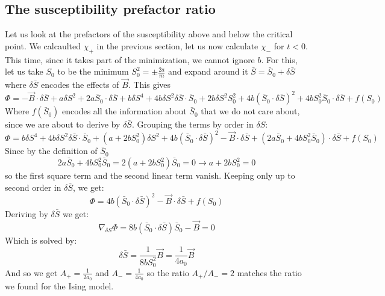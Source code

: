 \documentclass{article}
\begin{document}
\subsection{The susceptibility prefactor ratio}
Let us look at the prefactors of the susceptibility above and below the critical point. We calcaulted $\chi_{+}$ in the previous section, let us now calculate $\chi_{-}$ for $t < 0$. This time, since it takes part of the minimization, we cannot ignore $b$. For this, let us take $S_0$ to be the minimum $S_0^2 = \pm \frac{2a}{m}$ and expand around it $\bar{S} = \bar{S}_0 + \delta\bar{S}$ where $\delta\bar{S}$ encodes the effects of $\vec{B}$. This gives
\begin{equation}
    \Phi = - \vec{B}\cdot\delta\bar{S} +
    a\delta S^2 + 2a \bar{S}_0 \cdot \delta\bar{S} +
    b\delta S^4 + 4b \delta S^2 \delta\bar{S} \cdot \bar{S}_0 +
    2b \delta S^2 S_0^2 + 4b\left(\bar{S}_0 \cdot \delta\bar{S}\right)^2 +
    4b S_0^2 \bar{S}_0 \cdot \delta\bar{S}
    + f(S_0)
\end{equation}
Where $f(\bar{S}_0)$ encodes all the information about $\bar{S}_0$ that we do not care about, since we are about to derive by $\delta \bar{S}$. Grouping the terms by order in $\delta S$:
\begin{equation}
    \Phi = b\delta S^4
    + 4b \delta S^2 \delta\bar{S} \cdot \bar{S}_0
    + (a + 2b S_0^2) \delta S^2 + 4b\left(\bar{S}_0 \cdot \delta\bar{S}\right)^2
    - \vec{B}\cdot\delta\bar{S}
    + \left(2a \bar{S}_0 + 4 b S_0^2 \bar{S}_0\right) \cdot \delta\bar{S}
    + f(S_0)
\end{equation}
Since by the definition of $\bar{S}_0$
\begin{equation}
    2a \bar{S}_0 + 4 b S_0^2 \bar{S}_0 = 2(a + 2 b S_0^2) \bar{S}_0 = 0 
    \rightarrow
    a + 2 b S_0^2 = 0
\end{equation}
so the first square term and the second linear term vanish. Keeping only up to second order in $\delta \bar{S}$, we get:
\begin{equation}
    \Phi = 4b\left(\bar{S}_0 \cdot \delta\bar{S}\right)^2
    - \vec{B}\cdot\delta\bar{S}
    + f(S_0)
\end{equation}
Deriving by $\delta \bar{S}$ we get:
\begin{equation}
    \nabla_{\delta S} \Phi = 8b\left(\bar{S}_0 \cdot \delta\bar{S}\right) \bar{S}_0 - \vec{B} = 0
\end{equation}
Which is solved by:
\begin{equation}
    \delta \bar{S} = \frac{1}{8bS_0^2}\vec{B} = \frac{1}{4a_0}\vec{B}
\end{equation}
And so we get $A_{+} = \frac{1}{2a_0}$ and $A_{-} = \frac{1}{4a_0}$ so the ratio $A_{+} / A_{-} = 2$ matches the ratio we found for the Ising model.
\end{document}
